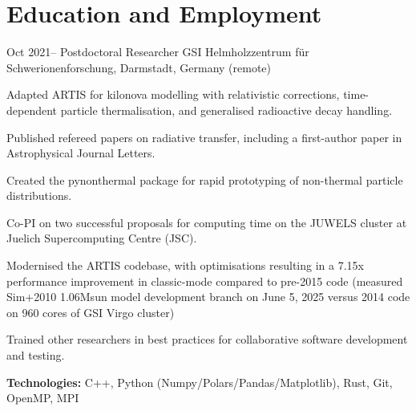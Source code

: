 \documentclass[11pt]{article} %
\begin{document}



\section{Education and Employment}

\job
{Oct 2021--}{}
{Postdoctoral Researcher}
{}
{GSI Helmholzzentrum für Schwerionenforschung, Darmstadt, Germany (remote)}
{\begin{itemize-noindent}
\item{Adapted ARTIS for kilonova modelling with relativistic corrections, time-dependent particle thermalisation, and generalised radioactive decay handling.}
\item{Published refereed papers on radiative transfer, including a first-author paper in Astrophysical Journal Letters.}
\item{Created the pynonthermal package for rapid prototyping of non-thermal particle distributions.}
\item{Co-PI on two successful proposals for computing time on the JUWELS cluster at Juelich Supercomputing Centre (JSC).}
\item{Modernised the ARTIS codebase, with optimisations resulting in a 7.15x performance improvement in classic-mode compared to pre-2015 code (measured Sim+2010 1.06Msun model development branch on June 5, 2025 versus 2014 code on 960 cores of GSI Virgo cluster)}
\item{Trained other researchers in best practices for collaborative software development and testing.}
\end{itemize-noindent}
\textbf{Technologies:} C++, Python (Numpy/Polars/Pandas/Matplotlib), Rust, Git, OpenMP, MPI
}
\end{document}
